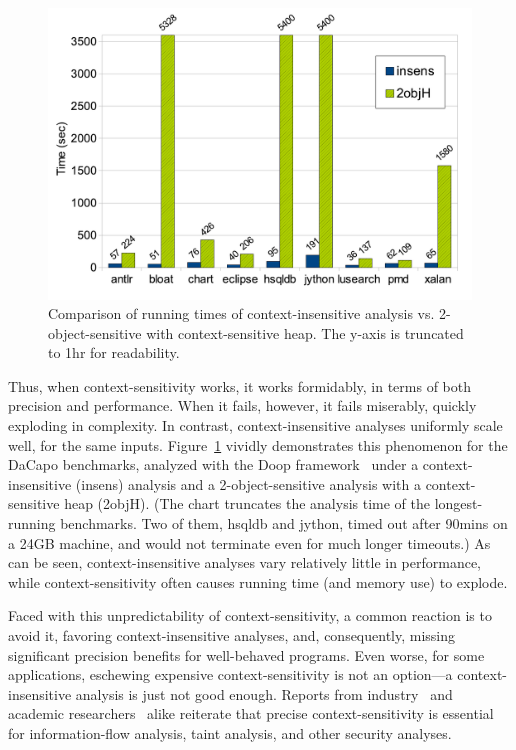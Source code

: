 \begin{figure}[tbp]
\begin{center}
\hspace{-2mm}\includegraphics[scale=0.42]{assets/introspective/intro-chart.pdf}
\end{center}
\vspace{-0.6cm}
\caption{Comparison of running times of context-insensitive analysis vs.
  2-object-sensitive with context-sensitive heap. The y-axis is
  truncated to 1hr for readability.}
\label{intro-chart}
\end{figure}

Thus, when context-sensitivity works, it works formidably, in terms of
both precision and performance. When it fails, however, it fails
miserably, quickly exploding in complexity. In contrast,
context-insensitive analyses uniformly scale well, for the same
inputs. Figure~\ref{intro-chart} vividly demonstrates this phenomenon
for the DaCapo benchmarks, analyzed with the Doop
framework~\cite{oopsla:2009:Bravenboer} under a context-insensitive (insens)
analysis and a 2-object-sensitive analysis with a context-sensitive
heap (2objH). (The chart truncates the analysis time of the
longest-running benchmarks. Two of them, hsqldb and jython, timed out
after 90mins on a 24GB machine, and would not terminate even for much
longer timeouts.) As can be seen, context-insensitive analyses vary
relatively little in performance, while context-sensitivity often
causes running time (and memory use) to explode.

Faced with this unpredictability of context-sensitivity, a
common reaction is to avoid it, favoring context-insensitive analyses,
and, consequently, missing significant precision benefits for
well-behaved programs. Even worse, for some applications, eschewing
expensive context-sensitivity is not an option---a context-insensitive
analysis is just not good enough.
Reports from industry~\cite{misc:Cifuentes} and academic
researchers~\cite{misc:Chong} alike reiterate that precise
context-sensitivity is essential for information-flow analysis, taint analysis,
and other security analyses.

